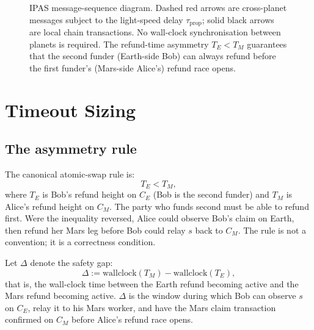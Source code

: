 \documentclass[11pt]{article}
\begin{document}
\begin{figure}[ht]
\caption{IPAS message-sequence diagram. Dashed red arrows are cross-planet messages subject to the light-speed delay $\tau_{\text{prop}}$; solid black arrows are local chain transactions. No wall-clock synchronisation between planets is required. The refund-time asymmetry $T_E < T_M$ guarantees that the second funder (Earth-side Bob) can always refund before the first funder's (Mars-side Alice's) refund race opens.}
\label{fig:sequence}
\end{figure}

\section{Timeout Sizing}
\label{sec:timeouts}

\subsection{The asymmetry rule}

The canonical atomic-swap rule \citep{comit2023} is:
\begin{equation}
T_E < T_M,
\end{equation}
where $T_E$ is Bob's refund height on $C_E$ (Bob is the second funder) and $T_M$ is Alice's refund height on $C_M$. The party who funds second must be able to refund first. Were the inequality reversed, Alice could observe Bob's claim on Earth, then refund her Mars leg before Bob could relay $s$ back to $C_M$. The rule is not a convention; it is a correctness condition.

Let $\Delta$ denote the safety gap:
\begin{equation}
\Delta := \text{wallclock}(T_M) - \text{wallclock}(T_E),
\label{eq:gap}
\end{equation}
that is, the wall-clock time between the Earth refund becoming active and the Mars refund becoming active. $\Delta$ is the window during which Bob can observe $s$ on $C_E$, relay it to his Mars worker, and have the Mars claim transaction confirmed on $C_M$ before Alice's refund race opens.
\end{document}
